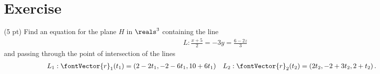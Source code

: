 \section{Exercise}

(5 pt) Find an equation for the plane $H$ in $\reals^{3}$ containing the line
\begin{align*}
L:
\frac{x + 5}{2}
=
-3 y
=
\frac{6 - 2 z}{3}
\end{align*}
and passing through the point of intersection of the lines
\begin{align*}
L_{1}:
\fontVector{r}_{1}(t_{1})
&=
\left(2 - 2 t_{1},-2 - 6 t_{1},10 + 6 t_{1}\right)
&
L_{2}:
\fontVector{r}_{2}(t_{2})
&=
\left(2 t_{2},-2 + 3 t_{2},2 + t_{2}\right).
\end{align*}



\spaceSolution{6in}{%
}%